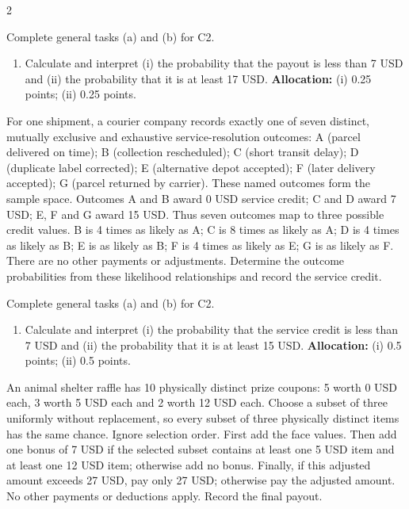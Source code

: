 \begin{multicols*}{2}
\begin{minipage}{\linewidth}
Complete general tasks (a)  and (b)  for C2.
\begin{enumerate}[label=(\alph*),start=3]
\item {} Calculate and interpret (i) the probability that the payout is less than 7 USD and (ii) the probability that it is at least 17 USD.
\textbf{Allocation:} (i) 0.25 points; (ii) 0.25 points.
\end{enumerate}
\end{minipage}\par\medskip

\noindent\begin{minipage}{\linewidth}
For one shipment, a courier company records exactly one of seven distinct, mutually exclusive and exhaustive service-resolution outcomes: A (parcel delivered on time); B (collection rescheduled); C (short transit delay); D (duplicate label corrected); E (alternative depot accepted); F (later delivery accepted); G (parcel returned by carrier). These named outcomes form the sample space. Outcomes A and B award 0 USD service credit; C and D award 7 USD; E, F and G award 15 USD. Thus seven outcomes map to three possible credit values. B is 4 times as likely as A; C is 8 times as likely as A; D is 4 times as likely as B; E is as likely as B; F is 4 times as likely as E; G is as likely as F. There are no other payments or adjustments. Determine the outcome probabilities from these likelihood relationships and record the service credit.

Complete general tasks (a)  and (b)  for C2.
\begin{enumerate}[label=(\alph*),start=3]
\item {} Calculate and interpret (i) the probability that the service credit is less than 7 USD and (ii) the probability that it is at least 15 USD.
\textbf{Allocation:} (i) 0.5 points; (ii) 0.5 points.
\end{enumerate}
\end{minipage}\par\medskip

\noindent\begin{minipage}{\linewidth}
An animal shelter raffle has 10 physically distinct prize coupons: 5 worth 0 USD each, 3 worth 5 USD each and 2 worth 12 USD each. Choose a subset of three uniformly without replacement, so every subset of three physically distinct items has the same chance. Ignore selection order. First add the face values. Then add one bonus of 7 USD if the selected subset contains at least one 5 USD item and at least one 12 USD item; otherwise add no bonus. Finally, if this adjusted amount exceeds 27 USD, pay only 27 USD; otherwise pay the adjusted amount. No other payments or deductions apply. Record the final payout.


\end{minipage}
\end{multicols*}
